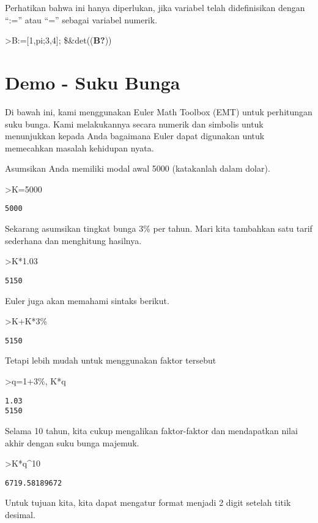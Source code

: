 \documentclass[
]{book}
\begin{document}
Perhatikan bahwa ini hanya diperlukan, jika variabel telah didefinisikan dengan ``:='' atau ``='' sebagai variabel numerik.

\textgreater B:={[}1,pi;3,4{]}; \$\&det((\textbf{B?}))

\chapter{Demo - Suku Bunga}\label{demo---suku-bunga}

Di bawah ini, kami menggunakan Euler Math Toolbox (EMT) untuk perhitungan suku bunga. Kami melakukannya secara numerik dan simbolis untuk menunjukkan kepada Anda bagaimana Euler dapat digunakan untuk memecahkan masalah kehidupan nyata.

Asumsikan Anda memiliki modal awal 5000 (katakanlah dalam dolar).

\textgreater K=5000

\begin{verbatim}
5000
\end{verbatim}

Sekarang asumsikan tingkat bunga 3\% per tahun. Mari kita tambahkan satu tarif sederhana dan menghitung hasilnya.

\textgreater K*1.03

\begin{verbatim}
5150
\end{verbatim}

Euler juga akan memahami sintaks berikut.

\textgreater K+K*3\%

\begin{verbatim}
5150
\end{verbatim}

Tetapi lebih mudah untuk menggunakan faktor tersebut

\textgreater q=1+3\%, K*q

\begin{verbatim}
1.03
5150
\end{verbatim}

Selama 10 tahun, kita cukup mengalikan faktor-faktor dan mendapatkan nilai akhir dengan suku bunga majemuk.

\textgreater K*q\^{}10

\begin{verbatim}
6719.58189672
\end{verbatim}

Untuk tujuan kita, kita dapat mengatur format menjadi 2 digit setelah titik desimal.
\end{document}
